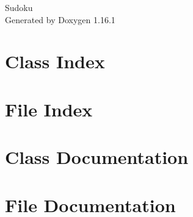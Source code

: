 \documentclass[twoside]{book}
\newcommand{\+}{\discretionary{\mbox{\scriptsize$\hookleftarrow$}}{}{}}
\newcommand{\clearemptydoublepage}{%
    \newpage{\pagestyle{empty}\cleardoublepage}%
  }
\begin{document}
  \raggedbottom
    \hypersetup{pageanchor=false,
                bookmarksnumbered=true,
                pdfencoding=unicode
               }
  \begin{titlepage}
  \vspace*{7cm}
  \begin{center}%
  {\Large Sudoku}\\
  \vspace*{1cm}
  {\large Generated by Doxygen 1.16.1}\\
  \end{center}
  \end{titlepage}
  \clearemptydoublepage
  \tableofcontents
  \clearemptydoublepage
  \hypersetup{pageanchor=true}
\chapter{Class Index}

\chapter{File Index}

\chapter{Class Documentation}






\chapter{File Documentation}






  \backmatter
  \newpage
  \clearemptydoublepage
  \printindex
\end{document}
